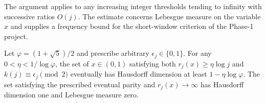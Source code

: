The argument applies to any increasing integer thresholds tending to
infinity with successive ratios $O(j)$. The estimate concerns
Lebesgue measure on the variable $x$ and supplies a frequency bound
for the short-window criterion of the Phase-1 project.

\begin{theorem}\label{thm:no-short-dim}
Let $\varphi=(1+\sqrt5)/2$ and prescribe arbitrary
$\epsilon_j\in\{0,1\}$. For any $0<\eta<1/\log\varphi$, the set of
$x\in(0,1)$ satisfying both $r_j(x)\ge\eta\log j$ and
$k(j)\equiv\epsilon_j\pmod2$ eventually has Hausdorff dimension at
least $1-\eta\log\varphi$. The set satisfying the prescribed
eventual parity and $r_j(x)\to\infty$ has Hausdorff dimension one
and Lebesgue measure zero.
\end{theorem}

